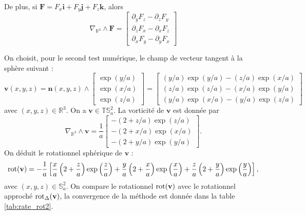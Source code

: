 De plus, si $\mathbf{F} = F_x \mathbf{i} + F_y \mathbf{j} + F_z  \mathbf{k}$, alors
\begin{equation}
\nabla_{\mathbb{R}^3} \wedge \mathbf{F} =
\begin{bmatrix}
\partial_y F_z - \partial_z F_y \\
\partial_z F_x - \partial_x F_z \\
\partial_x F_y - \partial_y F_x
\end{bmatrix} 
\end{equation}

On choisit, pour le second test numérique, le champ de vecteur tangent à la sphère suivant :
\begin{equation}
\mathbf{v}(x,y,z) = \mathbf{n}(x,y,z) \wedge \begin{bmatrix}
\exp (y/a) \\ \exp (x/a) \\ \exp (z/a)
\end{bmatrix} =
\begin{bmatrix}
(y/a) \exp (y/a) - (z/a) \exp (x/a)\\
(z/a) \exp (z/a) - (x/a) \exp (y/a)\\
(y/a) \exp (x/a) - (y/a) \exp (z/a)
\end{bmatrix} 
\label{eq:fun1_rot}
\end{equation}
avec $(x,y,z) \in \mathbb{R}^3$. On a $\mathbf{v} \in \mathbb{T}\mathbb{S}_a^2$.
La vorticité de $\mathbf{v}$ est donnée par
\begin{equation}
\nabla_{\mathbb{R}^3} \wedge \mathbf{v} = \dfrac{1}{a} \begin{bmatrix}
-(2+z/a) \exp (z/a)\\ -(2+x/a) \exp (x/a)\\ -(2+y/a) \exp (y/a)
\end{bmatrix}.
\end{equation}
On déduit le rotationnel sphérique de $\mathbf{v}$ :
\begin{equation}
\text{rot} ( \mathbf{v} ) = - \dfrac{1}{a} \left[ \dfrac{x}{a} \left( 2 + \dfrac{z}{a}  \right) \exp \left( \dfrac{z}{a} \right) + \dfrac{y}{a} \left( 2 + \dfrac{x}{a}  \right) \exp \left( \dfrac{x}{a} \right) + \dfrac{z}{a} \left( 2 + \dfrac{y}{a}  \right) \exp \left( \dfrac{y}{a} \right) \right],
\end{equation}
avec $(x,y,z) \in \mathbb{S}_a^2$. On compare le rotationnel $\text{rot} ( \mathbf{v} )$ avec le rotationnel approché $\text{rot}_{\Delta} ( \mathbf{v} )$, la convergence de la méthode est donnée dans la table \ref{tab:rate_rot2}.

